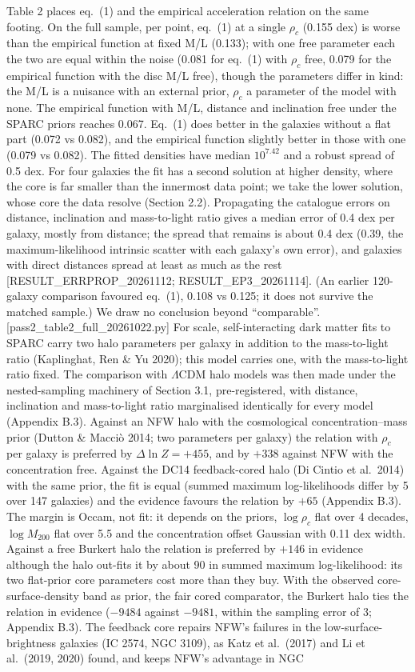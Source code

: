 \documentclass[
  10pt,
]{article}
\begin{document}
Table 2 places eq.~(1) and the empirical acceleration relation on the
same footing. On the full sample, per point, eq.~(1) at a single $\rho_c$ (0.155 dex) is worse than the empirical function at fixed M/L (0.133); with one free parameter each the two are equal within the noise (0.081 for eq.~(1) with $\rho_c$ free, 0.079 for the empirical function with the disc M/L free), though the parameters differ in kind: the M/L is a nuisance with an external prior, $\rho_c$ a parameter of the model with none. The empirical function with M/L, distance and inclination free under the SPARC priors reaches 0.067. Eq.~(1) does better in the galaxies without a flat part (0.072 vs 0.082), and the empirical function slightly better in those with one (0.079 vs 0.082). The fitted densities have median $10^{7.42}$ and a robust spread of 0.5 dex. For four galaxies the fit has a second solution at higher density, where the core is far smaller than the innermost data point; we take the lower solution, whose core the data resolve (Section 2.2). Propagating the catalogue errors on distance, inclination and mass-to-light ratio gives a median error of 0.4 dex per galaxy, mostly from distance; the spread that remains is about 0.4 dex (0.39, the maximum-likelihood intrinsic scatter with each galaxy's own error), and galaxies with direct distances spread at least as much as the rest {[}RESULT\_ERRPROP\_20261112; RESULT\_EP3\_20261114{]}. (An earlier 120-galaxy comparison favoured eq.~(1), 0.108 vs 0.125; it does not survive the matched sample.) We draw no conclusion beyond ``comparable''. {[}pass2\_table2\_full\_20261022.py{]} For scale, self-interacting dark matter fits to SPARC carry two halo parameters per galaxy in addition to the mass-to-light ratio (Kaplinghat, Ren \& Yu 2020); this model carries one, with the mass-to-light ratio fixed. The comparison with $\Lambda$CDM halo models was then made under the nested-sampling machinery of Section 3.1, pre-registered, with distance, inclination and mass-to-light ratio marginalised identically for every model (Appendix B.3). Against an NFW halo with the cosmological concentration--mass prior (Dutton \& Macci\`o 2014; two parameters per galaxy) the relation with $\rho_c$ per galaxy is preferred by $\Delta\ln Z=+455$, and by $+338$ against NFW with the concentration free. Against the DC14 feedback-cored halo (Di Cintio et al.~2014) with the same prior, the fit is equal (summed maximum log-likelihoods differ by 5 over 147 galaxies) and the evidence favours the relation by $+65$ (Appendix B.3). The margin is Occam, not fit: it depends on the priors, $\log\rho_c$ flat over 4 decades, $\log M_{200}$ flat over 5.5 and the concentration offset Gaussian with 0.11 dex width. Against a free Burkert halo the relation is preferred by $+146$ in evidence although the halo out-fits it by about 90 in summed maximum log-likelihood: its two flat-prior core parameters cost more than they buy. With the observed core-surface-density band as prior, the fair cored comparator, the Burkert halo ties the relation in evidence ($-9484$ against $-9481$, within the sampling error of 3; Appendix B.3). The feedback core repairs NFW's failures in the low-surface-brightness galaxies (IC 2574, NGC 3109), as Katz et al.~(2017) and Li et al.~(2019, 2020) found, and keeps NFW's advantage in NGC 
\end{document}
